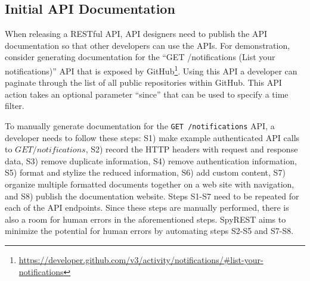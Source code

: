\subsection{Initial API Documentation} %
When releasing a RESTful API, API designers need to publish the API documentation so that other developers can use the APIs. For demonstration, consider generating documentation for the ``GET /notifications (List your notifications)'' API that is exposed by GitHub\footnote{\url{https://developer.github.com/v3/activity/notifications/\#list-your-notifications}}. Using this API a developer can paginate through the list of all public repositories within GitHub. This API action takes an optional parameter ``since'' that can be used to specify a time filter.

To manually generate documentation for the \texttt{GET /notifications} API, a developer needs to follow these steps: S1) make example authenticated API calls to $GET /notifications$, S2) record the HTTP headers with request and response data, S3) remove duplicate information, S4) remove authentication information, S5) format and stylize the reduced information, S6) add custom content, S7) organize multiple formatted documents together on a web site with navigation, and S8) publish the documentation website. Steps S1-S7 need to be repeated for each of the API endpoints. Since these steps are manually performed, there is also a room for human errors in the aforementioned steps. SpyREST aims to minimize the potential for human errors by automating steps S2-S5 and S7-S8.

